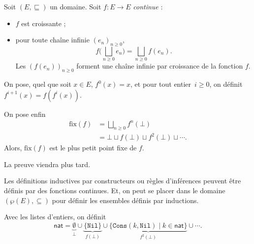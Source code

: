 \documentclass[../main]{subfiles}
\begin{document}
  \begin{thm}\label{thm:lub-fix}
    Soit $(E, \sqsubseteq)$ un domaine. Soit $f : E \to E$ \textit{continue} : 
    \begin{itemize}
      \item $f$ est croissante ;
      \item pour toute chaîne infinie  $(e_n)_{n \ge 0}$,
        \[
          f\Big( \bigsqcup_{n \ge 0} e_n \Big) = \bigsqcup_{n \ge 0} f(e_n)
        .\] 
      Les $(f(e_n))_{n \ge 0}$ forment une chaîne infinie par croissance de la fonction $f$.
    \end{itemize}

    On pose, quel que soit $x \in E$, $f^0(x) = x$, et pour tout entier~$i \ge  0$, on définit $f^{i+1}(x) = f(f^i(x))$.

    On pose enfin 
    \begin{align*}
      \mathrm{fix}(f) &= \bigsqcup_{n \ge 0} f^n(\bot)\\
      &= \bot \sqcup f(\bot) \sqcup f^2(\bot) \sqcup \cdots
    .\end{align*}
    Alors, $\mathrm{fix}(f)$ est le plus petit point fixe de $f$.
  \end{thm}
  \begin{prv}
    La preuve viendra plus tard.
  \end{prv}

  Les définitions inductives par constructeurs ou règles d'inférences peuvent être définis par des fonctions continues.
  Et, on peut se placer dans le domaine $(\wp(E), \subseteq)$ pour définir les ensembles définis par inductions.

  \begin{exm}
    Avec les listes d'entiers, on définit \[
      \mathsf{nat} = \underbrace{\emptyset}_\bot \cup \underbrace{\{\mathtt{Nil}\}}_{f(\bot)} \cup \underbrace{\{\mathtt{Cons}(k, \mathtt{Nil})  \mid k \in \mathsf{nat}\}}_{f^2(\bot)} \cup \cdots 
    .\]
  \end{exm}
\end{document}
